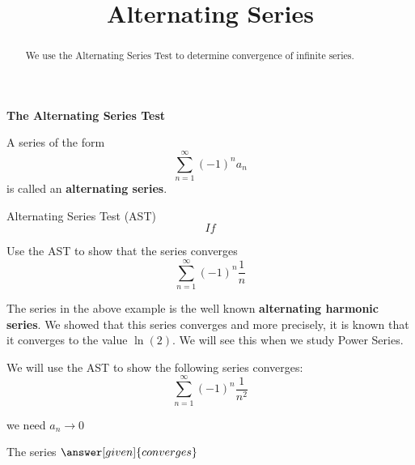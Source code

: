 \documentclass{ximera}
\title{Alternating Series}
\begin{document}
\begin{abstract}
We use the Alternating Series Test to determine convergence of infinite series.
\end{abstract}

\maketitle

\begin{center}
\textbf{The Alternating Series Test}
\end{center}

A series of the form
\[\sum_{n=1}^\infty (-1)^n a_n\]
is called an \textbf{alternating series}.

\begin{theorem} Alternating Series Test (AST)
\[
If
\]
\end{theorem}






\begin{example} %
Use the AST to show that the series converges
 \[
  \sum_{n=1}^\infty (-1)^n \frac{1}{n}
  \]
\end{example}

\begin{center}
\begin{foldable}
\end{foldable}
\end{center}

The series in the above example is the well known \textbf{alternating harmonic series}.  We showed that this series converges and more precisely, it is known that it converges to the value $\ln(2)$.  We will see this when we study Power Series.

\begin{problem} %
  We will use the AST to show the following series converges:
  \[
  \sum_{n=1}^\infty (-1)^n \frac{1}{n^2}
  \]
    \begin{hint}
      we need $a_n \to 0$
    \end{hint}
    
		
		The series
		 $\answer[given]{converges}$
\end{problem}


\begin{center}
\begin{foldable}
\end{foldable}
\end{center}
\end{document}
